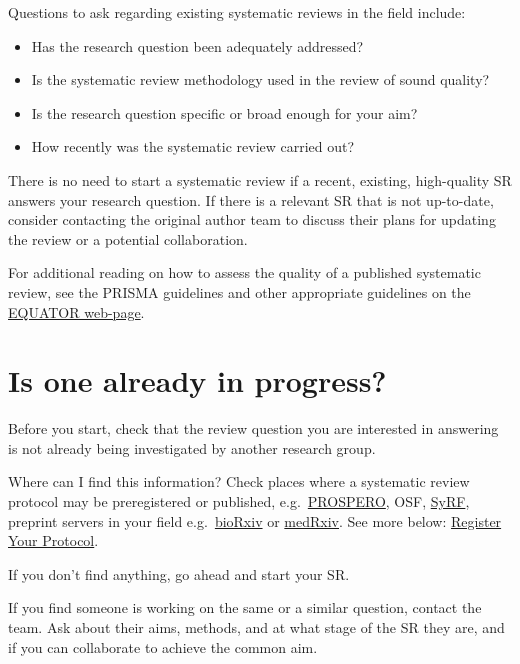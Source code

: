 \documentclass[
]{book}
\providecommand{\tightlist}{%
  \setlength{\itemsep}{0pt}\setlength{\parskip}{0pt}}
\begin{document}
Questions to ask regarding existing systematic reviews in the field include:

\begin{itemize}
\tightlist
\item
  Has the research question been adequately addressed?
\item
  Is the systematic review methodology used in the review of sound quality?
\item
  Is the research question specific or broad enough for your aim?
\item
  How recently was the systematic review carried out?
\end{itemize}

There is no need to start a systematic review if a recent, existing, high-quality SR answers your research question. If there is a relevant SR that is not up-to-date, consider contacting the original author team to discuss their plans for updating the review or a potential collaboration.

For additional reading on how to assess the quality of a published systematic review, see the PRISMA guidelines and other appropriate guidelines on the \href{https://www.equator-network.org/}{EQUATOR web-page}.

\hypertarget{is-one-already-in-progress}{%
\section{Is one already in progress?}\label{is-one-already-in-progress}}

Before you start, check that the review question you are interested in answering is not already being investigated by another research group.

Where can I find this information?
Check places where a systematic review protocol may be preregistered or published, e.g.~\href{https://www.crd.york.ac.uk/prospero/}{PROSPERO}, OSF, \href{https://syrf.org.uk/}{SyRF}, preprint servers in your field e.g.~\href{https://www.biorxiv.org/}{bioRxiv} or \href{https://www.medrxiv.org/}{medRxiv}. See more below: \protect\hyperlink{register-your-protocol}{Register Your Protocol}.

If you don't find anything, go ahead and start your SR.

If you find someone is working on the same or a similar question, contact the team. Ask about their aims, methods, and at what stage of the SR they are, and if you can collaborate to achieve the common aim.
\end{document}
